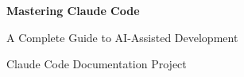 \begin{titlepage}
  \thispagestyle{empty}
  \centering
  \vspace*{2cm}
  {\fontsize{36}{44}\selectfont\bfseries Mastering Claude Code\par}
  \vspace{1cm}
  {\Large A Complete Guide to AI-Assisted Development\par}
  \vspace{3cm}
  {\large Claude Code Documentation Project\par}
  \vfill
  {\large \the\year\par}
\end{titlepage}
